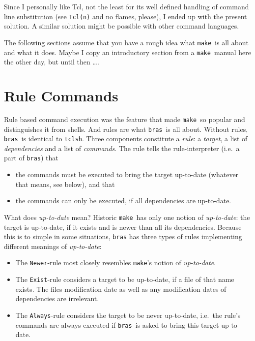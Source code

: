 \documentclass[12pt]{article}
\newcommand{\bras}{\texttt{bras}}
\newcommand{\make}{\texttt{make}}
\begin{document}
Since I personally like Tcl, not the least for its well defined
handling of command line substitution (see \texttt{Tcl(n)} and no
flames, please), I ended up with the present solution. A similar
solution might be possible with other command languages.

The following sections assume that you have a rough idea what \make\
is all about and what it does. Maybe I copy an introductory
section from a \make\ manual here the other day, but until then
\ldots.

\section{Rule Commands}

Rule based command execution was the feature that made \make\ so
popular and distinguishes it from shells. And rules are what
\bras\ is all about. Without rules, \bras\ is identical to
\texttt{tclsh}. Three components constitute a \textit{rule}: a
\textit{target}, a list of \textit{dependencies} and a list of
\textit{commands}. The rule tells the rule-interpreter (i.e.\ a part
of \bras) that
\begin{itemize}
\item the commands must be executed to bring the target up-to-date
(whatever that means, see below), and that
\item the commands can only be executed, if all dependencies are
up-to-date.
\end{itemize}

What does \textit{up-to-date} mean? Historic \make\ has only one
notion of \textit{up-to-date}: the target is up-to-date, if it exists
and is newer than all its dependencies. Because this is to simple in
some situations, \bras{} has three types of rules implementing
different meanings of \textit{up-to-date}:

\begin{itemize}
\item The \texttt{Newer}-rule most closely resembles \make's notion of
\textit{up-to-date}.
\item The \texttt{Exist}-rule considers a target to be up-to-date,
if a file of that name exists. The files modification date as well as
any modification dates of dependencies are irrelevant.
\item The \texttt{Always}-rule considers the target to be never
up-to-date, i.e.\ the rule's commands are always executed if
\bras\ is asked to bring this target up-to-date.
\end{itemize}
\end{document}
